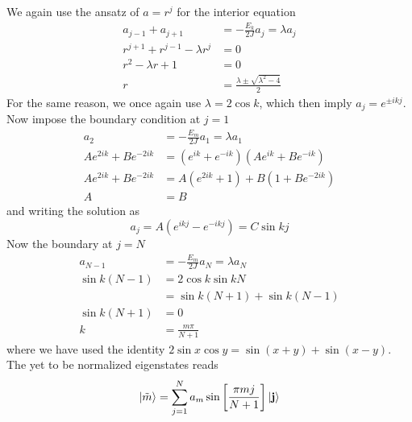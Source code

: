\documentclass[../../../main.tex]{subfiles}
\begin{document}
We again use the ansatz of $a=r^j$ for the interior equation
\begin{align*}
    a_{j-1} + a_{j+1}                    & =  - \frac{E_k}{2J }  a_j  = \lambda a_j       \\
    r ^{j+1 } + r ^{j-1} -\lambda r ^{j} & =  0                                           \\
    r^2 -\lambda r +1                    & =  0                                           \\
    r                                    & = \frac{\lambda \pm \sqrt{\lambda^2 -4 } }{2 }
\end{align*}
For the same reason, we once again use $\lambda =2 \cos k$, which then imply $a_j = e ^{\pm ikj}$.
Now impose the boundary condition at $j=1$
\begin{align*}
    a_2                     & =  - \frac{E_m }{2J} a_1 = \lambda a_1           \\
    Ae ^{2ik} + B e ^{-2ik} & = (e ^{ik } + e ^{-ik }) (Ae ^{ik} + B e ^{-ik}) \\
    Ae ^{2ik} + B e ^{-2ik} & = A(e ^{2ik } + 1) + B (1 + B e ^{-2ik})         \\
    A                       & = B
\end{align*}
and writing the solution as
\begin{equation*}
    a_j = A(e ^{ikj}- e ^{-ikj}) = C \sin kj
\end{equation*}
Now the boundary at $j=N$
\begin{align*}
    a_{N-1}     & =  - \frac{ E_m }{2J} a_N = \lambda a_N \\
    \sin k(N-1) & = 2 \cos k \sin kN                      \\
                & = \sin k(N+1) + \sin k(N-1)             \\
    \sin k(N+1) & = 0                                     \\
    k           & =  \frac{m\pi}{N+1}
\end{align*}
where we have used the identity $2 \sin x \cos y = \sin (x+y) + \sin (x-y)$.
The yet to be normalized eigenstates reads
\begin{equation*}
    \ket{\tilde{m}  } =
    \sum_{j=1 }^N a_m \sin \left[\frac{\pi m j}{N+1} \right] \ket{\mathbf{j}}
\end{equation*}
\end{document}
